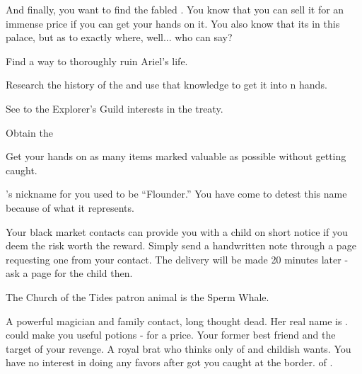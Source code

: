 \documentclass[char]{NeptuneBall}
\begin{document}
And finally, you want to find the fabled \iGlowShell{\MYname}. You know that you can sell it for an immense price if you can get your hands on it. You also know that its in this palace, but as to exactly where, well... who can say?

\begin{itemz}[Goals]
  \item Find a way to thoroughly ruin Ariel's life.
	\item Research the history of the \pGazaStrip{} and use that knowledge to get it into \pAtlantis{}n hands.
	\item See to the Explorer's Guild interests in the treaty.
	\item Obtain the \iGlowShell{}
	\item Get your hands on as many items marked valuable as possible without getting caught.
\end{itemz}

\begin{itemz}[Notes]
	\item \cAriel{}'s nickname for you used to be ``Flounder.'' You have come to detest this name because of what it represents.
  \item Your black market contacts can provide you with a child on short notice if you deem the risk worth the reward. Simply send a handwritten note through a page requesting one from your contact. The delivery will be made 20 minutes later - ask a page for the child then. 
\end{itemz}

\begin{itemz}[Trivia]
  \item The Church of the Tides patron animal is the Sperm Whale.
\end{itemz}

\begin{contacts}
  \contact{\cWitch{\MYname}} A powerful magician and family contact, long thought dead. Her real name is \cWitch{}. \cWitch{\They} could make you useful potions - for a price.
  \contact{\cAriel{}} Your former best friend and the target of your revenge.
  \contact{\cPrincess{}} A royal brat who thinks only of \cPrincess{\themself} and \cPrincess{\their} childish wants. You have no interest in doing \cPrincess{\them} any favors after \cPrincess{\they} got you caught at the border.
  \contact{\cKing{}} \cKing{\King} of \pAtlantis{}. 
\end{contacts}
\end{document}
